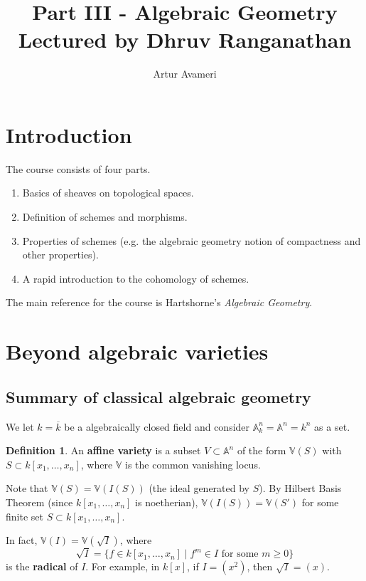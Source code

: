 \documentclass{article}
\title{Part III - Algebraic Geometry
    \\ \large
    Lectured by Dhruv Ranganathan 
}
\author{Artur Avameri}
\date{}
\theoremstyle{definition}
\newtheorem{defn}{Definition}[section]
\begin{document}
\maketitle
\tableofcontents
\newpage
 
\section{Introduction}



The course consists of four parts.
\begin{enumerate}[(1)]
    \item Basics of sheaves on topological spaces.
    \item Definition of schemes and morphisms.
    \item Properties of schemes (e.g. the algebraic geometry notion of compactness and other properties).
    \item A rapid introduction to the cohomology of schemes.
\end{enumerate}

The main reference for the course is Hartshorne's \textit{Algebraic Geometry}.

\section{Beyond algebraic varieties}

\subsection{Summary of classical algebraic geometry}
We let $k = \overline{k}$ be a algebraically closed field and consider $\mathbb{A}_k^n = \mathbb{A}^n = k^n$ as a set.

\begin{defn}
    An \textbf{affine variety} is a subset $V \subset \mathbb{A}^n$ of the form $\mathbb{V}(S)$ with $S \subset k[x_1,\ldots,x_n]$, where $\mathbb{V}$ is the common vanishing locus.
\end{defn}
Note that $\mathbb{V}(S) = \mathbb{V}(I(S))$ (the ideal generated by $S$). By Hilbert Basis Theorem (since $k[x_1,\ldots,x_n]$ is noetherian), $\mathbb{V}(I(S)) = \mathbb{V}(S')$ for some finite set $S \subset k[x_1,\ldots,x_n]$.
\vspace{1mm}
 
In fact, $\mathbb{V}(I) = \mathbb{V}(\sqrt{I})$, where \[
\sqrt{I} = \{ f \in k[x_1,\ldots,x_n] \mid f^m \in I \text{ for some } m\ge 0\}
\] 
is the \textbf{radical} of $I$.
For example, in $k[x]$, if $I = (x^2)$, then $\sqrt{I} = (x)$.
\end{document}
